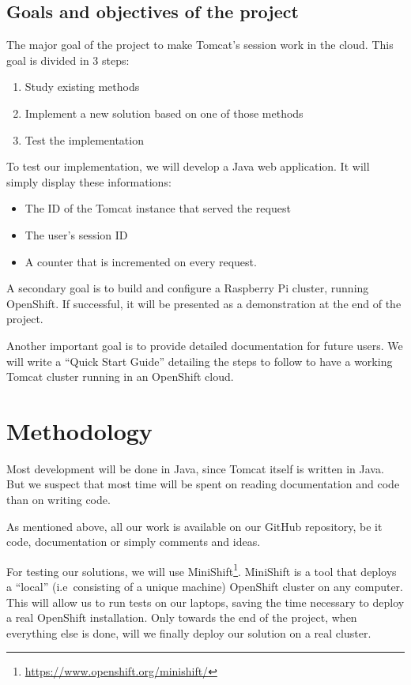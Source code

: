 \documentclass[11pt,a4paper]{article}
\begin{document}
\subsection{Goals and objectives of the project}

The major goal of the project to make Tomcat's session work in the cloud. This
goal is divided in 3 steps:
\begin{enumerate}
    \item Study existing methods
    \item Implement a new solution based on one of those methods
    \item Test the implementation
\end{enumerate}

To test our implementation, we will develop a Java web application. It
will simply display these informations:

\begin{itemize}
    \item The ID of the Tomcat instance that served the request
    \item The user's session ID
    \item A counter that is incremented on every request.
\end{itemize}

A secondary goal is to build and configure a Raspberry Pi cluster, running
OpenShift. If successful, it will be presented as a demonstration at the end of
the project.

Another important goal is to provide detailed documentation for future users.
We will write a ``Quick Start Guide'' detailing the steps to follow to have a
working Tomcat cluster running in an OpenShift cloud.


\section{Methodology}

Most development will be done in Java, since Tomcat itself is written in Java.
But we suspect that most time will be spent on reading documentation and code
than on writing code.

As mentioned above, all our work is available on our GitHub repository, be it
code, documentation or simply comments and ideas.

For testing our solutions, we will use
MiniShift\footnote{\url{https://www.openshift.org/minishift/}}. MiniShift is a tool
that deploys a ``local'' (i.e\ consisting of a unique machine) OpenShift
cluster on any computer. This will allow us to run tests on our laptops, saving
the time necessary to deploy a real OpenShift installation. Only towards the
end of the project, when everything else is done, will we finally deploy our
solution on a real cluster.
\end{document}
